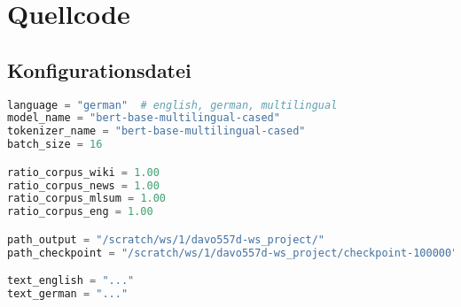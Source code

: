 \chapter*{Quellcode}

\section*{Konfigurationsdatei}
\begin{lstlisting}[language=Python, caption=Konfigurationsdatei]
language = "german"  # english, german, multilingual
model_name = "bert-base-multilingual-cased"
tokenizer_name = "bert-base-multilingual-cased"
batch_size = 16

ratio_corpus_wiki = 1.00
ratio_corpus_news = 1.00
ratio_corpus_mlsum = 1.00
ratio_corpus_eng = 1.00

path_output = "/scratch/ws/1/davo557d-ws_project/"
path_checkpoint = "/scratch/ws/1/davo557d-ws_project/checkpoint-100000"

text_english = "..."
text_german = "..."
\end{lstlisting}
\newpage



